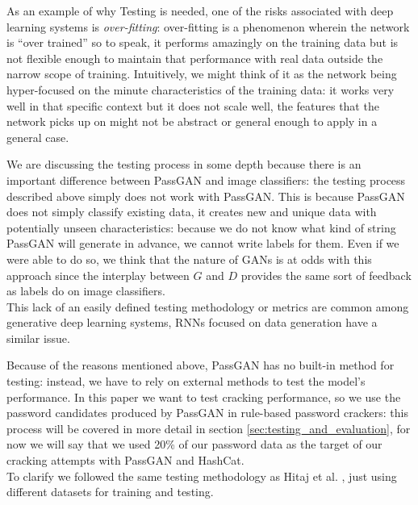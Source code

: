 As an example of why Testing is needed, one of the risks associated with deep learning systems is \emph{over-fitting}: over-fitting is a phenomenon wherein the network is \enquote{over trained} so to speak, it performs amazingly on the training data but is not flexible enough to maintain that performance with real data outside the narrow scope of training. Intuitively, we might think of it as the network being hyper-focused on the minute characteristics of the training data: it works very well in that specific context but it does not scale well, the features that the network picks up on might not be abstract or general enough to apply in a general case. 

We are discussing the testing process in some depth because there is an important difference between PassGAN and image classifiers: the testing process described above simply does not work with PassGAN.
This is because PassGAN does not simply classify existing data, it creates new and unique data with potentially unseen characteristics: because we do  not know what kind of string PassGAN will generate in advance, we cannot write labels for them. Even if we were able to do so, we think that the nature of GANs is at odds with this approach since the interplay between $G$ and $D$ provides the same sort of feedback as labels do on image classifiers.\\

This lack of an easily defined testing methodology or metrics are common among generative deep learning systems, RNNs focused on data generation have a similar issue.

Because of the reasons mentioned above, PassGAN has no built-in method for testing: instead, we have to rely on external methods to test the model's performance.
In this paper we want to test cracking performance, so we use the password candidates produced by PassGAN in rule-based password crackers: this process will be covered in more detail in section \ref{sec:testing_and_evaluation}, for now we will say that we used 20\% of our password data as the target of our cracking attempts with PassGAN and HashCat.\\%
To clarify we followed the same testing methodology as Hitaj et  al. \cite{PassGAN}, just using different datasets for training and testing.


